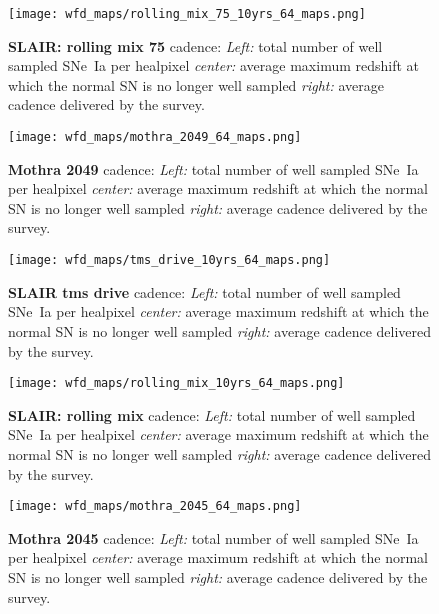 \begin{figure}[h!]
  \begin{center}
    \texttt{[image: wfd\_maps/rolling\_mix\_75\_10yrs\_64\_maps.png]}
    \caption{{\bf SLAIR: rolling mix 75} cadence: {\em Left:} total number of well
      sampled SNe~Ia per healpixel {\em center:} average maximum
      redshift at which the normal SN is no longer well sampled {\em
        right:} average cadence delivered by the survey.}
    \label{fig:rolling_mix_75}
  \end{center}
\end{figure}


\begin{figure}[h!]
  \begin{center}
    \texttt{[image: wfd\_maps/mothra\_2049\_64\_maps.png]}
    \caption{{\bf Mothra 2049} cadence: {\em Left:} total number of well
      sampled SNe~Ia per healpixel {\em center:} average maximum
      redshift at which the normal SN is no longer well sampled {\em
        right:} average cadence delivered by the survey.}
    \label{fig:mothra_2049}
  \end{center}
\end{figure}

\begin{figure}[h!]
  \begin{center}
    \texttt{[image: wfd\_maps/tms\_drive\_10yrs\_64\_maps.png]}
    \caption{{\bf SLAIR tms drive} cadence: {\em Left:} total number of well
      sampled SNe~Ia per healpixel {\em center:} average maximum
      redshift at which the normal SN is no longer well sampled {\em
        right:} average cadence delivered by the survey.}
    \label{fig:tms_drive}
  \end{center}
\end{figure}

\begin{figure}[h!]
  \begin{center}
    \texttt{[image: wfd\_maps/rolling\_mix\_10yrs\_64\_maps.png]}
    \caption{{\bf SLAIR: rolling mix} cadence: {\em Left:} total number of well
      sampled SNe~Ia per healpixel {\em center:} average maximum
      redshift at which the normal SN is no longer well sampled {\em
        right:} average cadence delivered by the survey.}
    \label{fig:rolling_mix}
  \end{center}
\end{figure}

\begin{figure}[h!]
  \begin{center}
    \texttt{[image: wfd\_maps/mothra\_2045\_64\_maps.png]}
    \caption{{\bf Mothra 2045} cadence: {\em Left:} total number of well
      sampled SNe~Ia per healpixel {\em center:} average maximum
      redshift at which the normal SN is no longer well sampled {\em
        right:} average cadence delivered by the survey.}
    \label{fig:mothra_2045}
  \end{center}
\end{figure}

